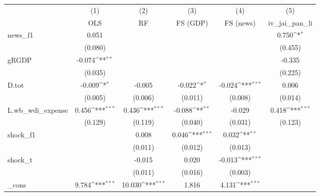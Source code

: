 {
\def\sym#1{\ifmmode^{#1}\else\(^{#1}\)\fi}
\begin{tabular}{l*{5}{c}}
\toprule
            &\multicolumn{1}{c}{(1)}&\multicolumn{1}{c}{(2)}&\multicolumn{1}{c}{(3)}&\multicolumn{1}{c}{(4)}&\multicolumn{1}{c}{(5)}\\
            &\multicolumn{1}{c}{OLS}&\multicolumn{1}{c}{RF}&\multicolumn{1}{c}{FS (GDP)}&\multicolumn{1}{c}{FS (news)}&\multicolumn{1}{c}{iv\_jai\_pan\_li}\\
\midrule
news\_f1     &       0.051         &                     &                     &                     &       0.750\sym{*}  \\
            &     (0.080)         &                     &                     &                     &     (0.455)         \\
\addlinespace
gRGDP       &      -0.074\sym{**} &                     &                     &                     &      -0.335         \\
            &     (0.035)         &                     &                     &                     &     (0.225)         \\
\addlinespace
D.tot       &      -0.009\sym{*}  &      -0.005         &      -0.022\sym{*}  &      -0.024\sym{***}&       0.006         \\
            &     (0.005)         &     (0.006)         &     (0.011)         &     (0.008)         &     (0.014)         \\
\addlinespace
L.wb\_wdi\_expense&       0.456\sym{***}&       0.436\sym{***}&      -0.088\sym{**} &      -0.029         &       0.418\sym{***}\\
            &     (0.129)         &     (0.119)         &     (0.040)         &     (0.031)         &     (0.123)         \\
\addlinespace
shock\_f1    &                     &       0.008         &       0.046\sym{***}&       0.032\sym{**} &                     \\
            &                     &     (0.011)         &     (0.012)         &     (0.013)         &                     \\
\addlinespace
shock\_t     &                     &      -0.015         &       0.020         &      -0.013\sym{***}&                     \\
            &                     &     (0.011)         &     (0.016)         &     (0.003)         &                     \\
\addlinespace
\_cons      &       9.784\sym{***}&      10.030\sym{***}&       1.816         &       4.131\sym{***}&                     \\

\end{tabular}}
